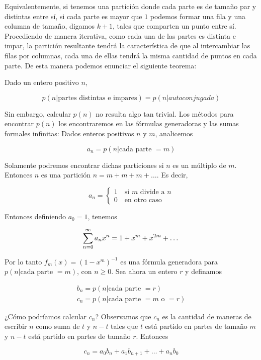 Equivalentemente, si tenemos una partición donde cada parte es de tamaño par y distintas entre sí, si cada parte es mayor que $1$ podemos formar una fila y una columna de tamaño, digamos $k+1$, tales que comparten un punto entre sí. Procediendo de manera iterativa, como cada una de las partes es distinta e impar, la partición resultante tendrá la característica de que al intercambiar las filas por columnas, cada una de ellas tendrá la misma cantidad de puntos en cada parte. De esta manera podemos enunciar el siguiente teorema:

\begin{teo}
    Dado un entero positivo $n$,
    
    \[
    p(n|\text{partes distintas e impares}) = p(n|autoconjugada)
    \]
\end{teo}

Sin embargo, calcular $p(n)$ no resulta algo tan trivial. Los métodos para encontrar $p(n)$ los encontraremos en las fórmulas generadoras y las sumas formales infinitas: Dados enteros positivos $n$ y $m$, analicemos

\[
a_n = p(n|\text{cada parte $= m$})
\]

Solamente podremos encontrar dichas particiones si $n$ es un múltiplo de $m$. Entonces $n$ es una partición $n = m + m + m + \dots$. Es decir,

\[
a_n =
\begin{cases}
    1 \quad \text{si $m$ divide a $n$} \\
    0 \quad \text{en otro caso}
\end{cases}
\]

Entonces definiendo $a_0 = 1$, tenemos

\[
\sum_{n=0}^{\infty} a_nx^n = 1 + x^m + x^{2m} + \dots
\]

Por lo tanto $f_m(x) = (1-x^m)^{-1}$ es una fórmula generadora para $p(n|\text{cada parte $= m$})$, con $n \geq 0$. Sea ahora un entero $r$ y definamos

\begin{gather*}
    b_n = p(n| \text{cada parte $=r$}) \\
    c_n = p(n| \text{cada parte $= m$ o $= r$})
\end{gather*}

¿Cómo podríamos calcular $c_n$? Observamos que $c_n$ es la cantidad de maneras de escribir $n$ como suma de $t$ y $n-t$ tales que $t$ está partido en partes de tamaño $m$ y $n-t$ está partido en partes de tamaño $r$. Entonces

\[
c_n = a_0b_n + a_1b_{n+1} + \dots + a_nb_0
\]

